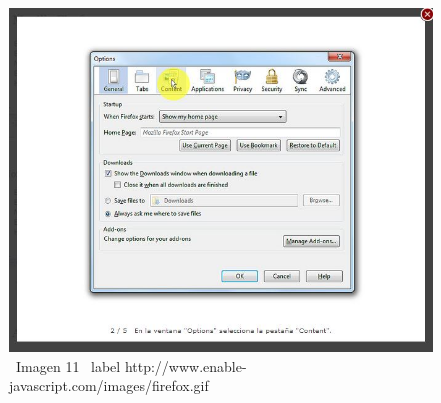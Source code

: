 \documentclass[11pt]{article} %
\begin{document}
\begin{figure}
\begin{center}
\includegraphics[height=8 cm, width=8 cm] {imagenes/firefox 02.jpg}
\newline
\newline
\ Imagen 11
\ label {http://www.enable-javascript.com/images/firefox.gif }

\end{center}
\end{figure}
\end{document}
